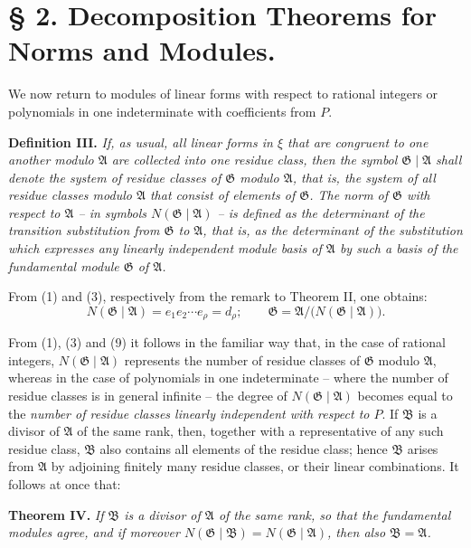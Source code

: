 \documentclass[11pt]{article}
\providecommand{\Amod}{\mathfrak A}
\providecommand{\Bmod}{\mathfrak B}
\providecommand{\Gmod}{\mathfrak G}
\providecommand{\Norm}{N}
\providecommand{\Amod}{\mathfrak A}
\providecommand{\Bmod}{\mathfrak B}
\providecommand{\Gmod}{\mathfrak G}
\providecommand{\Norm}{N}
\providecommand{\Norm}{\operatorname{N}}
\providecommand{\Norm}{\operatorname{N}}
\begin{document}
\section*{§ 2. Decomposition Theorems for Norms and Modules.}

We now return to modules of linear forms with respect to rational integers or polynomials in one indeterminate with coefficients from $P$.

\medskip
\noindent\textbf{Definition III.} \emph{If, as usual, all linear forms in $\xi$ that are congruent to one another modulo $\Amod$ are collected into one residue class, then the symbol $\Gmod\mid\Amod$ shall denote the system of residue classes of $\Gmod$ modulo $\Amod$, that is, the system of all residue classes modulo $\Amod$ that consist of elements of $\Gmod$. The norm of $\Gmod$ with respect to $\Amod$ -- in symbols $\Norm(\Gmod\mid\Amod)$ -- is defined as the determinant of the transition substitution from $\Gmod$ to $\Amod$, that is, as the determinant of the substitution which expresses any linearly independent module basis of $\Amod$ by such a basis of the fundamental module $\Gmod$ of $\Amod$.}

From (1) and (3), respectively from the remark to Theorem II, one obtains:
\begin{equation}
 \Norm(\Gmod\mid\Amod)=e_1e_2\cdots e_\rho=d_\rho;
 \qquad
 \Gmod=\Amod/\bigl(\Norm(\Gmod\mid\Amod)\bigr).
\tag{9}
\end{equation}

From (1), (3) and (9) it follows in the familiar way that, in the case of rational integers, $\Norm(\Gmod\mid\Amod)$ represents the number of residue classes of $\Gmod$ modulo $\Amod$, whereas in the case of polynomials in one indeterminate -- where the number of residue classes is in general infinite -- the degree of $\Norm(\Gmod\mid\Amod)$ becomes equal to the \emph{number of residue classes linearly independent with respect to $P$}. If $\Bmod$ is a divisor of $\Amod$ of the same rank, then, together with a representative of any such residue class, $\Bmod$ also contains all elements of the residue class; hence $\Bmod$ arises from $\Amod$ by adjoining finitely many residue classes, or their linear combinations. It follows at once that:

\medskip
\noindent\textbf{Theorem IV.} \emph{If $\Bmod$ is a divisor of $\Amod$ of the same rank, so that the fundamental modules agree, and if moreover $\Norm(\Gmod\mid\Bmod)=\Norm(\Gmod\mid\Amod)$, then also $\Bmod=\Amod$.}
\end{document}

